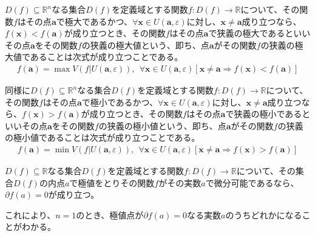 \documentclass[dvipdfmx]{jsarticle}
\begin{document}
\begin{dfn}\label{狭義の極大値と極小値}
$D(f) \subseteq \mathbb{R}^{n}$なる集合$D(f)$を定義域とする関数$f:D(f) \rightarrow \mathbb{R}$について、その関数$f$はその点$\mathbf{a}$で極大であるかつ、$\forall\mathbf{x} \in U\left( \mathbf{a},\varepsilon \right)$に対し、$\mathbf{x} \neq \mathbf{a}$成り立つなら、$f\left( \mathbf{x} \right) < f\left( \mathbf{a} \right)$が成り立つとき、その関数$f$はその点$\mathbf{a}$で狭義の極大であるといいその点$\mathbf{a}$をその関数$f$の狭義の極大値という、即ち、点$\mathbf{a}$がその関数$f$の狭義の極大値であることは次式が成り立つことである。
\begin{align*}
f\left( \mathbf{a} \right) = \max{V\left( f|U\left( \mathbf{a},\varepsilon \right) \right)},\ \ \forall\mathbf{x} \in U\left( \mathbf{a},\varepsilon \right)\left[ \mathbf{x} \neq \mathbf{a} \Rightarrow f\left( \mathbf{x} \right) < f\left( \mathbf{a} \right) \right]
\end{align*}\par
同様に$D(f) \subseteq \mathbb{R}^{n}$なる集合$D(f)$を定義域とする関数$f:D(f) \rightarrow \mathbb{R}$について、その関数$f$はその点$\mathbf{a}$で極小であるかつ、$\forall\mathbf{x} \in U\left( \mathbf{a},\varepsilon \right)$に対し、$\mathbf{x} \neq \mathbf{a}$成り立つなら、$f\left( \mathbf{x} \right) > f\left( \mathbf{a} \right)$が成り立つとき、その関数$f$はその点$\mathbf{a}$で狭義の極小であるといいその点$\mathbf{a}$をその関数$f$の狭義の極小値という、即ち、点$\mathbf{a}$がその関数$f$の狭義の極小値であることは次式が成り立つことである。
\begin{align*}
f\left( \mathbf{a} \right) = \min{V\left( f|U\left( \mathbf{a},\varepsilon \right) \right)},\ \ \forall\mathbf{x} \in U\left( \mathbf{a},\varepsilon \right)\left[ \mathbf{x} \neq \mathbf{a} \Rightarrow f\left( \mathbf{x} \right) > f\left( \mathbf{a} \right) \right]
\end{align*}
\end{dfn}
\begin{thm}\label{4.2.2.1}
$D(f) \subseteq \mathbb{R}$なる集合$D(f)$を定義域とする関数$f:D(f) \rightarrow \mathbb{R}$について、その集合$D(f)$の内点$a$で極値をとりその関数$f$がその実数$a$で微分可能であるなら、$\partial f(a) = 0$が成り立つ。
\end{thm}\par
これにより、$n = 1$のとき、極値点が$\partial f(a) = 0$なる実数$a$のうちどれかになることがわかる。
\end{document}
